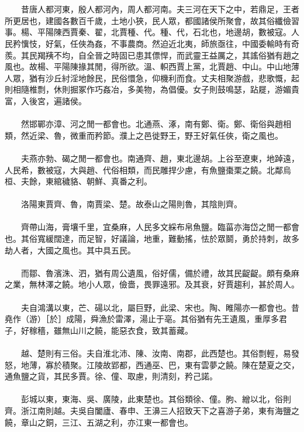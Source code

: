 \\\\
　　昔唐人都河東，殷人都河內，周人都河南。夫三河在天下之中，若鼎足，王者所更居也，建國各數百千歲，土地小狹，民人眾，都國諸侯所聚會，故其俗纖儉習事。楊、平陽陳西賈秦、翟，北賈種、代。種、代，石北也，地邊胡，數被寇。人民矜懻忮，好氣，任俠為姦，不事農商。然迫近北夷，師旅亟往，中國委輸時有奇羨。其民羯羠不均，自全晉之時固已患其僄悍，而武靈王益厲之，其謠俗猶有趙之風也。故楊、平陽陳掾其閒，得所欲。溫、軹西賈上黨，北賈趙、中山。中山地薄人眾，猶有沙丘紂淫地餘民，民俗懁急，仰機利而食。丈夫相聚游戲，悲歌慨，起則相隨椎剽，休則掘冢作巧姦冶，多美物，為倡優。女子則鼓鳴瑟，跕屣，游媚貴富，入後宮，遍諸侯。
\\\\
　　然邯鄲亦漳、河之閒一都會也。北通燕、涿，南有鄭、衛。鄭、衛俗與趙相類，然近梁、魯，微重而矜節。濮上之邑徙野王，野王好氣任俠，衛之風也。
\\\\
　　夫燕亦勃、碣之閒一都會也。南通齊、趙，東北邊胡。上谷至遼東，地踔遠，人民希，數被寇，大與趙、代俗相類，而民雕捍少慮，有魚鹽棗栗之饒。北鄰烏桓、夫餘，東綰穢貉、朝鮮、真番之利。
\\\\
　　洛陽東賈齊、魯，南賈梁、楚。故泰山之陽則魯，其陰則齊。
\\\\
　　齊帶山海，膏壤千里，宜桑麻，人民多文綵布帛魚鹽。臨菑亦海岱之閒一都會也。其俗寬緩闊達，而足智，好議論，地重，難動搖，怯於眾鬬，勇於持刺，故多劫人者，大國之風也。其中具五民。
\\\\
　　而鄒、魯濱洙、泗，猶有周公遺風，俗好儒，備於禮，故其民齪齪。頗有桑麻之業，無林澤之饒。地小人眾，儉嗇，畏罪遠邪。及其衰，好賈趨利，甚於周人。
\\\\
　　夫自鴻溝以東，芒、碭以北，屬巨野，此梁、宋也。陶、睢陽亦一都會也。昔堯作（游）［於］成陽，舜漁於雷澤，湯止于亳。其俗猶有先王遺風，重厚多君子，好稼穡，雖無山川之饒，能惡衣食，致其蓄藏。
\\\\
　　越、楚則有三俗。夫自淮北沛、陳、汝南、南郡，此西楚也。其俗剽輕，易發怒，地薄，寡於積聚。江陵故郢都，西通巫、巴，東有雲夢之饒。陳在楚夏之交，通魚鹽之貨，其民多賈。徐、僮、取慮，則清刻，矜己諾。
\\\\
　　彭城以東，東海、吳、廣陵，此東楚也。其俗類徐、僮。朐、繒以北，俗則齊。浙江南則越。夫吳自闔廬、春申、王濞三人招致天下之喜游子弟，東有海鹽之饒，章山之銅，三江、五湖之利，亦江東一都會也。

